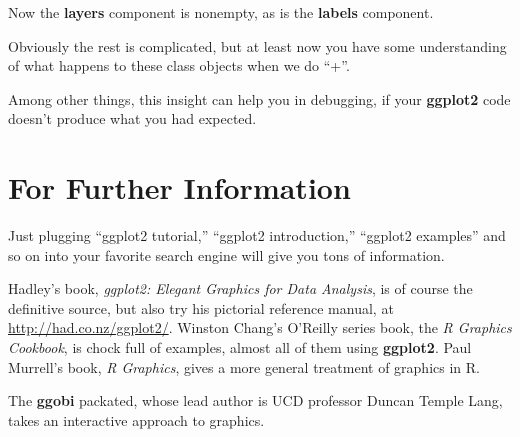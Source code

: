 Now the {\bf layers} component is nonempty, as is the {\bf labels}
component.  

Obviously the rest is complicated, but at least now you have some
understanding of what happens to these class objects when we do ``+''.

Among other things, this insight can help you in debugging, if your {\bf
ggplot2} code doesn't produce what you had expected.

\section{For Further Information}

Just plugging ``ggplot2 tutorial,'' ``ggplot2 introduction,'' ``ggplot2
examples'' and so on into your favorite search engine will give you tons
of information.

Hadley's book, {\it ggplot2: Elegant Graphics for Data Analysis}, is of
course the definitive source, but also try his pictorial reference
manual, at \url{http://had.co.nz/ggplot2/}.  Winston Chang's O'Reilly
series book, the {\it R Graphics Cookbook}, is chock full of examples,
almost all of them using {\bf ggplot2}.  Paul Murrell's book, {\it R
Graphics}, gives a more general treatment of graphics in R.

The {\bf ggobi} packated, whose lead author is UCD professor Duncan
Temple Lang, takes an interactive approach to graphics.

% 


